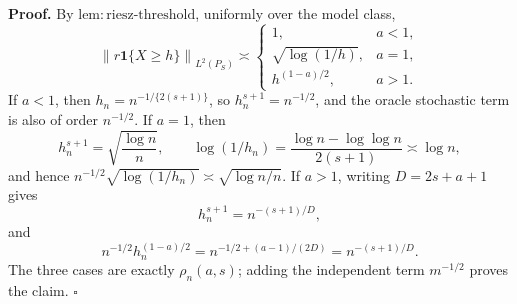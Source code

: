 \textbf{Proof.}
By \(\mathrm{lem:riesz\text{-}threshold}\), uniformly over the model class,
\[
 \left\|r\mathbf 1\{X\ge h\}\right\|_{L^2(P_S)}
 \asymp
 \begin{cases}
 1,&a<1,\\
 \sqrt{\log(1/h)},&a=1,\\
 h^{(1-a)/2},&a>1.
 \end{cases}
\]
If \(a<1\), then \(h_n=n^{-1/\{2(s+1)\}}\), so \(h_n^{s+1}=n^{-1/2}\), and the oracle stochastic term is also of order \(n^{-1/2}\).  If \(a=1\), then
\[
 h_n^{s+1}=\sqrt{\frac{\log n}{n}},
 \qquad
 \log(1/h_n)=\frac{\log n-\log\log n}{2(s+1)}\asymp\log n,
\]
and hence \(n^{-1/2}\sqrt{\log(1/h_n)}\asymp\sqrt{\log n/n}\).  If \(a>1\), writing \(D=2s+a+1\) gives
\[
 h_n^{s+1}=n^{-(s+1)/D},
\]
and
\[
 n^{-1/2}h_n^{(1-a)/2}
 =n^{-1/2+(a-1)/(2D)}
 =n^{-(s+1)/D}.
\]
The three cases are exactly \(\rho_n(a,s)\); adding the independent term \(m^{-1/2}\) proves the claim. \(\square\)